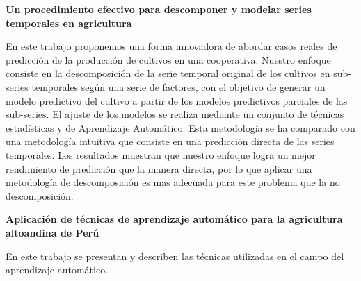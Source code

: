\par\textbf{Un procedimiento efectivo para descomponer y modelar series
temporales en agricultura} 
\cite{aragon2018procedimiento} 
\par En este trabajo proponemos una forma innovadora de abordar casos reales de
predicción de la producción de cultivos en una cooperativa. Nuestro enfoque
consiste en la descomposición de la serie temporal original de los cultivos en
sub-series temporales según una serie de factores, con el objetivo de generar
un modelo predictivo del cultivo a partir de los modelos predictivos parciales
de las sub-series. El ajuste de los modelos se realiza mediante un conjunto de
técnicas estadísticas y de Aprendizaje Automático. Esta metodología se ha
comparado con una metodología intuitiva que consiste en una predicción directa
de las series temporales. Los resultados muestran que nuestro enfoque logra un
mejor rendimiento de predicción que la manera directa, por lo que aplicar una
metodología de descomposición es mas adecuada para este problema que la no
descomposición.

\par\textbf{Aplicación de técnicas de aprendizaje automático para la
agricultura altoandina de Perú} 
\cite{caceresaplicacion}
\par En este trabajo se presentan  y describen las técnicas utilizadas en el
campo del aprendizaje automático. 
